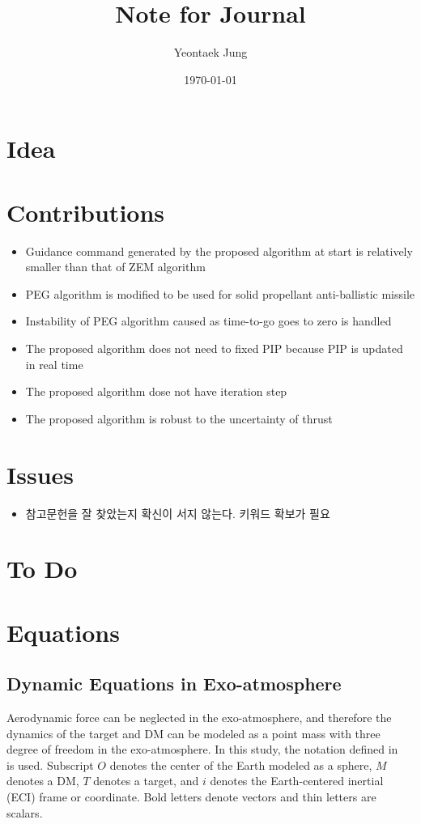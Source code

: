 \documentclass{fdclreport}
\title{Note for Journal}
\author{Yeontaek Jung}
\date{\today}
\begin{document}
\maketitle
\section{Idea}


\section{Contributions}
\begin{itemize}
	\item Guidance command generated by the proposed algorithm at start is relatively smaller than that of ZEM algorithm
	\item PEG algorithm is modified to be used for solid propellant anti-ballistic missile
	\item Instability of PEG algorithm caused as time-to-go goes to zero is handled
	\item The proposed algorithm does not need to fixed PIP because PIP is updated in real time
	\item The proposed algorithm dose not have iteration step
	\item The proposed algorithm is robust to the uncertainty of thrust
\end{itemize}

\section{Issues}
\begin{itemize}
	\item 참고문헌을 잘 찾았는지 확신이 서지 않는다. 키워드 확보가 필요
\end{itemize}

\section{To Do}

\makedetailedcontents

\section{Equations}

\subsection{Dynamic Equations in Exo-atmosphere}
Aerodynamic force can be neglected in the exo-atmosphere, and therefore the dynamics of the target and DM can be modeled as a point mass with three degree of freedom in the exo-atmosphere.
In this study, the notation defined in~\cite{stevens} is used.
Subscript $O$ denotes the center of the Earth modeled as a sphere, $M$ denotes a DM, $T$ denotes a target, and $i$ denotes the Earth-centered inertial (ECI) frame or coordinate.
Bold letters denote vectors and thin letters are scalars.
\end{document}
